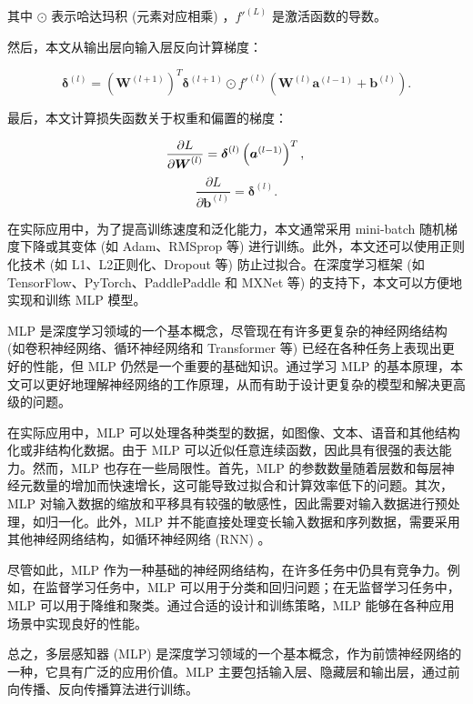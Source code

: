 其中 $\odot$ 表示哈达玛积 (元素对应相乘) ，$f'^{(L)}$ 是激活函数的导数。

然后，本文从输出层向输入层反向计算梯度：

\begin{equation}
\boldsymbol{\delta}^{(l)} = \left( \boldsymbol{W}^{(l+1)} \right)^T \boldsymbol{\delta}^{(l+1)} \odot f'^{(l)}(\boldsymbol{W}^{(l)}\boldsymbol{a}^{(l-1)} + \boldsymbol{b}^{(l)}).
\end{equation}

最后，本文计算损失函数关于权重和偏置的梯度：

\begin{equation}
\frac{\partial L}{\partial \boldsymbol{W}^{(l)}} = \boldsymbol{\delta}^{(l)} \left( \boldsymbol{a}^{(l-1)} \right)^T, \\
\end{equation}
\begin{equation}
\frac{\partial L}{\partial \boldsymbol{b}^{(l)}} = \boldsymbol{\delta}^{(l)}.
\end{equation}

在实际应用中，为了提高训练速度和泛化能力，本文通常采用 mini-batch 随机梯度下降或其变体 (如 Adam、RMSprop 等) 进行训练。此外，本文还可以使用正则化技术 (如 L1、L2正则化、Dropout 等) 防止过拟合。在深度学习框架 (如 TensorFlow、PyTorch、PaddlePaddle 和 MXNet 等) 的支持下，本文可以方便地实现和训练 MLP 模型\cite{lecun2015deep}。

MLP 是深度学习领域的一个基本概念，尽管现在有许多更复杂的神经网络结构 (如卷积神经网络、循环神经网络和 Transformer 等) 已经在各种任务上表现出更好的性能，但 MLP 仍然是一个重要的基础知识。通过学习 MLP 的基本原理，本文可以更好地理解神经网络的工作原理，从而有助于设计更复杂的模型和解决更高级的问题。

在实际应用中，MLP 可以处理各种类型的数据，如图像、文本、语音和其他结构化或非结构化数据。由于 MLP 可以近似任意连续函数，因此具有很强的表达能力。然而，MLP 也存在一些局限性。首先，MLP 的参数数量随着层数和每层神经元数量的增加而快速增长，这可能导致过拟合和计算效率低下的问题。其次，MLP 对输入数据的缩放和平移具有较强的敏感性，因此需要对输入数据进行预处理，如归一化。此外，MLP 并不能直接处理变长输入数据和序列数据，需要采用其他神经网络结构，如循环神经网络 (RNN) 。

尽管如此，MLP 作为一种基础的神经网络结构，在许多任务中仍具有竞争力。例如，在监督学习任务中，MLP 可以用于分类和回归问题；在无监督学习任务中，MLP 可以用于降维和聚类。通过合适的设计和训练策略，MLP 能够在各种应用场景中实现良好的性能。

总之，多层感知器 (MLP) 是深度学习领域的一个基本概念，作为前馈神经网络的一种，它具有广泛的应用价值。MLP 主要包括输入层、隐藏层和输出层，通过前向传播、反向传播算法进行训练。
